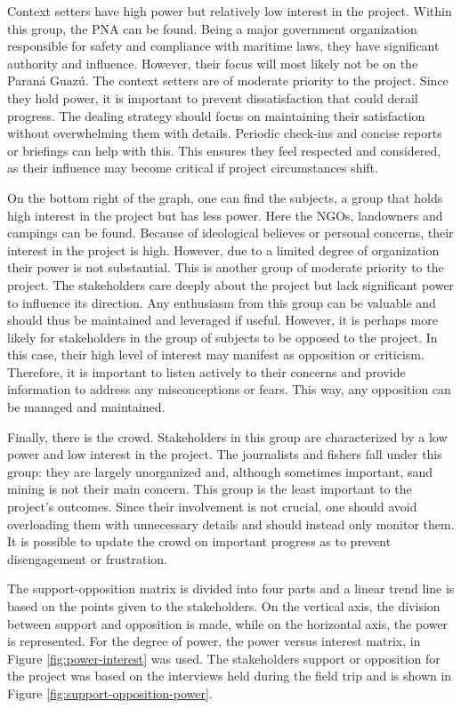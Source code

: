 Context setters have high power but relatively low interest in the project. Within this group, the PNA can be found. Being a major government organization responsible for safety and compliance with maritime laws, they have significant authority and influence. However, their focus will most likely not be on the Paraná Guazú. The context setters are of moderate priority to the project. Since they hold power, it is important to prevent dissatisfaction that could derail progress. The dealing strategy should focus on maintaining their satisfaction without overwhelming them with details. Periodic check-ins and concise reports or briefings can help with this. This ensures they feel respected and considered, as their influence may become critical if project circumstances shift.

On the bottom right of the graph, one can find the subjects, a group that holds high interest in the project but has less power. Here the NGOs, landowners and campings can be found. Because of ideological believes or personal concerns, their interest in the project is high. However, due to a limited degree of organization their power is not substantial. This is another group of moderate priority to the project. The stakeholders care deeply about the project but lack significant power to influence its direction. Any enthusiasm from this group can be valuable and should thus be maintained and leveraged if useful. However, it is perhaps more likely for stakeholders in the group of subjects to be opposed to the project. In this case, their high level of interest may manifest as opposition or criticism. Therefore, it is important to listen actively to their concerns and provide information to address any misconceptions or fears. This way, any opposition can be managed and maintained.

Finally, there is the crowd. Stakeholders in this group are characterized by a low power and low interest in the project. The journalists and fishers fall under this group: they are largely unorganized and, although sometimes important, sand mining is not their main concern. This group is the least important to the project's outcomes. Since their involvement is not crucial, one should avoid overloading them with unnecessary details and should instead only monitor them. It is possible to update the crowd on important progress as to prevent disengagement or frustration.

The support-opposition matrix is divided into four parts and a linear trend line is based on the points given to the stakeholders. On the vertical axis, the division between support and opposition is made, while on the horizontal axis, the power is represented. For the degree of power, the power versus interest matrix, in Figure \ref{fig:power-interest} was used. The stakeholders support or opposition for the project was based on the interviews held during the field trip and is shown in Figure \ref{fig:support-opposition-power}.

